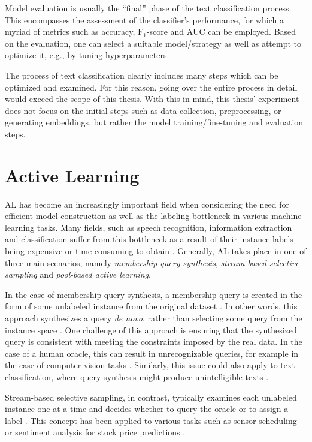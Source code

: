 \documentclass[english,bachelor,ul]{webisthesis} %
\begin{document}
Model evaluation is usually the ``final'' phase of the text classification process. This encompasses the assessment of the classifier's performance, for which a myriad of metrics such as accuracy, $\text{F}_1$-score and AUC can be employed. Based on the evaluation, one can select a suitable model/strategy as well as attempt to optimize it, e.g., by tuning hyperparameters.

The process of text classification clearly includes many steps which can be optimized and examined. For this reason, going over the entire process in detail would exceed the scope of this thesis. With this in mind, this thesis' experiment does not focus on the initial steps such as data collection, preprocessing, or generating embeddings, but rather the model training/fine-tuning and evaluation steps.


\section{Active Learning}

AL has become an increasingly important field when considering the need for efficient model construction as well as the labeling bottleneck in various machine learning tasks. Many fields, such as speech recognition, information extraction and classification suffer from this bottleneck as a result of their instance labels being expensive or time-consuming to obtain \citep{settles.tr09}. Generally, AL takes place in one of three main scenarios, namely \textit{membership query synthesis}, \textit{stream-based selective sampling} and \textit{pool-based active learning}. 

In the case of membership query synthesis, a membership query is created in the form of some unlabeled instance from the original dataset \citep{DBLP:journals/ml/Angluin87, DBLP:journals/ijon/WangHYL15}. In other words, this approach synthesizes a query \textit{de novo}, rather than selecting some query from the instance space \citep{settles.tr09}. One challenge of this approach is ensuring that the synthesized query is consistent with meeting the constraints imposed by the real data. In the case of a human oracle, this can result in unrecognizable queries, for example in the case of computer vision tasks \citep{langbaum92}. Similarly, this issue could also apply to text classification, where query synthesis might produce unintelligible texts \citep{settles.tr09}.

Stream-based selective sampling, in contrast, typically examines each unlabeled instance one at a time and decides whether to query the oracle or to assign a label \citep{settles.tr09}. This concept has been applied to various tasks such as sensor scheduling \citep{DBLP:journals/tsp/Krishnamurthy02} or sentiment analysis for stock price predictions \citep{DBLP:journals/isci/SmailovicGLZ14}.
\end{document}
